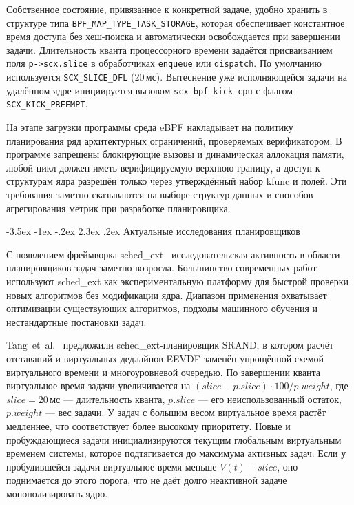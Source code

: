 \documentclass[14pt, oneside]{extbook}
\makeatletter
\renewcommand\section{\@startsection {section}{1}{\z@}%
                                   {-3.5ex \@plus -1ex \@minus -.2ex}%
                                   {2.3ex \@plus.2ex}%
                                   {\normalfont\fontsize{16}{20}\selectfont\bfseries}}
\makeatother
\begin{document}
        Собственное состояние, привязанное к конкретной задаче,
        удобно хранить в структуре типа \texttt{BPF\_MAP\_TYPE\_TASK\_STORAGE},
        которая обеспечивает константное время доступа без хеш-поиска
        и автоматически освобождается при завершении задачи.
        Длительность кванта процессорного времени задаётся
        присваиванием поля \texttt{p->scx.slice} в обработчиках
        \texttt{enqueue} или \texttt{dispatch}. По умолчанию
        используется \texttt{SCX\_SLICE\_DFL} (20\,мс). Вытеснение уже
        исполняющейся задачи на удалённом ядре инициируется
        вызовом \texttt{scx\_bpf\_kick\_cpu} с флагом
        \texttt{SCX\_KICK\_PREEMPT}.

        На этапе загрузки программы среда eBPF накладывает на
        политику планирования ряд архитектурных ограничений,
        проверяемых верификатором. В программе запрещены блокирующие
        вызовы и динамическая аллокация памяти, любой цикл должен
        иметь верифицируемую верхнюю границу, а доступ к структурам
        ядра разрешён только через утверждённый набор kfunc и полей.
        Эти требования заметно сказываются на выборе структур данных
        и способов агрегирования метрик при разработке планировщика.


\section{Актуальные исследования планировщиков}

        С появлением фреймворка sched\_ext~\cite{schedext}
        исследовательская активность
        в области планировщиков задач заметно возросла. Большинство
        современных работ используют sched\_ext как экспериментальную платформу
        для быстрой проверки новых алгоритмов без модификации ядра.
        Диапазон применения охватывает оптимизации существующих алгоритмов,
        подходы машинного обучения и нестандартные постановки задач.

        Tang~et~al.~\cite{srand} предложили sched\_ext-планировщик
        SRAND, в котором расчёт отставаний и виртуальных дедлайнов
        EEVDF заменён упрощённой схемой виртуального времени и
        многоуровневой очередью. По завершении кванта виртуальное
        время задачи увеличивается на
        $(slice - p.slice) \cdot 100 / p.weight$, где
        $slice = 20\,$мс — длительность кванта, $p.slice$ — его
        неиспользованный остаток, $p.weight$ — вес задачи. У задач
        с большим весом виртуальное время растёт медленнее, что
        соответствует более высокому приоритету. Новые и
        пробуждающиеся задачи инициализируются текущим глобальным
        виртуальным временем системы, которое подтягивается до
        максимума активных задач. Если у пробудившейся задачи
        виртуальное время меньше $V(t) - slice$, оно поднимается
        до этого порога, что не даёт долго неактивной задаче
        монополизировать ядро.
\end{document}
